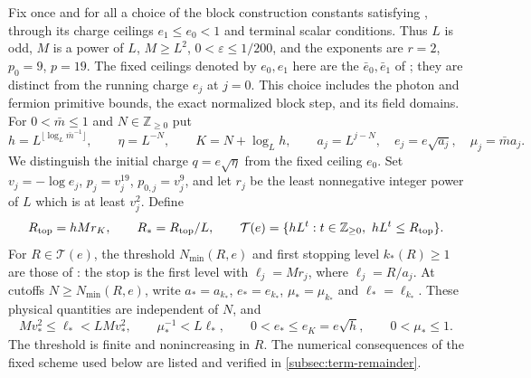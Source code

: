 \documentclass[11pt,letterpaper,reqno]{amsart}
\newcommand{\Z}{\mathbb Z}
\begin{document}
Fix once and for all a choice of the block construction constants
satisfying \cite[Proposition~4.1]{QED3Integration}, through its
charge ceilings $e_1\le e_0<1$ and terminal scalar conditions.
Thus $L$ is odd, $M$ is a power of $L$, $M\ge L^2$,
$0<\varepsilon\le1/200$, and the exponents are
$r=2$, $p_0=9$, $p=19$.
The fixed ceilings denoted by $e_0,e_1$ here are the
$\bar e_0,\bar e_1$ of \cite{QED3Integration};
they are distinct from the running charge $e_j$ at $j=0$.
This choice includes the photon and fermion primitive bounds,
the exact normalized block step, and its field domains.
For $0<\bar m\le1$ and $N\in\Z_{\ge0}$ put
\[
 h=L^{\lfloor\log_L\bar m^{-1}\rfloor},\qquad
 \eta=L^{-N},\qquad K=N+\log_Lh,\qquad
 a_j=L^{j-N},\quad e_j=e\sqrt{a_j},\quad \mu_j=\bar m a_j.
\]
We distinguish the initial charge $q=e\sqrt\eta$ from the fixed
ceiling $e_0$. Set $v_j=-\log e_j$, $p_j=v_j^{19}$,
$p_{0,j}=v_j^9$, and let $r_j$ be the least nonnegative
integer power of $L$ which is at least $v_j^2$. Define
\[
 R_{\rm top}=hMr_K,\qquad R_*=R_{\rm top}/L,\qquad
 \mathcal T(e)=\{hL^t:t\in\Z_{\ge0},\ hL^t\le R_{\rm top}\}.
\]
For $R\in\mathcal T(e)$, the threshold $N_{\min}(R,e)$
and first stopping level $k_*(R)\ge1$ are those of
\cite[Proposition~6.1 and (52)]{CoverTuning}:
the stop is the first level with $\ell_j=Mr_j$, where
$\ell_j=R/a_j$. At cutoffs $N\ge N_{\min}(R,e)$, write
$a_*=a_{k_*}$, $e_*=e_{k_*}$, $\mu_*=\mu_{k_*}$ and
$\ell_*=\ell_{k_*}$. These physical quantities are independent of $N$,
and
\begin{equation}\label{eq:tpm-stop-scales}
 Mv_*^2\le\ell_*<LMv_*^2,\qquad
 \mu_*^{-1}<L\ell_*,\qquad 0<e_*\le e_K=e\sqrt h,\qquad
 0<\mu_*\le1.
\end{equation}
The threshold is finite and nonincreasing in $R$.
The numerical consequences of the fixed scheme used below are
listed and verified in \cref{subsec:term-remainder}.
\end{document}
